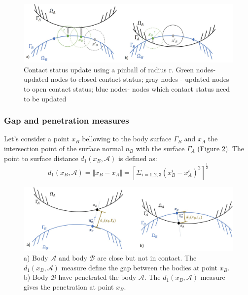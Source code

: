 \begin{figure}[!h]
\centering
\includegraphics[width=1\textwidth,keepaspectratio]{figures/pinball.jpg} 
\caption{Contact status update using a pinball of radius r. Green nodes- updated nodes to closed contact status; gray nodes - updated nodes to open contact status; blue nodes- nodes which contact status need to be updated}
\label{fig:pinball}
\end{figure}

 
 \subsubsection*{Gap and penetration measures} 
  Let's consider a point $x_B$ bellowing to the body surface $\Gamma_B$ and $x_A$ the intersection point of the surface normal $n_B$ with the surface $\Gamma_A$ (Figure \ref{gap_penetration}). The point to surface distance $d_1(x_B,\mathcal{A})$  is defined as:
\begin{equation}
\label{normalContactdistance}
d_1(x_B,\mathcal{A}) = \Vert x_B-x_A \Vert = \left[  \Sigma_{i={1,2,3}}\left( x_B^i - x_A^i \right)^2\right]^{\frac{1}{2}}
\end{equation}

 \begin{center}
\begin{figure}
\centerline{\includegraphics[width=1\textwidth,keepaspectratio]{figures/gap_penetration.jpg} }
\caption{a) Body $\mathcal{A}$ and body $\mathcal{B}$ are close but not in contact. The $d_1(x_B,\mathcal{A})$ measure define the gap between the bodies at point $x_B$.  b) Body $\mathcal{B}$ have penetrated the body $\mathcal{A}$. The $d_1(x_B,\mathcal{A})$ measure gives the penetration at point $x_B$.}
\label{gap_penetration}
\end{figure}
\end{center}

